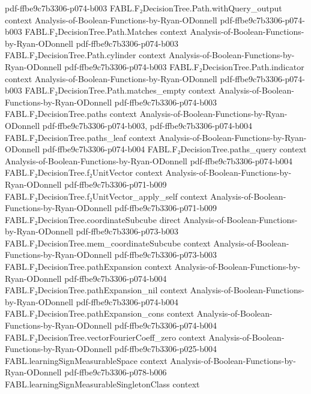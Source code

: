 \begin{theorem}
  {pdf-ffbe9c7b3306-p074-b003}
\proofstep
  {FABL.F₂DecisionTree.Path.withQuery_output}
  {context}
  {Analysis-of-Boolean-Functions-by-Ryan-ODonnell}
  {pdf-ffbe9c7b3306-p074-b003}
\proofstep
  {FABL.F₂DecisionTree.Path.Matches}
  {context}
  {Analysis-of-Boolean-Functions-by-Ryan-ODonnell}
  {pdf-ffbe9c7b3306-p074-b003}
\proofstep
  {FABL.F₂DecisionTree.Path.cylinder}
  {context}
  {Analysis-of-Boolean-Functions-by-Ryan-ODonnell}
  {pdf-ffbe9c7b3306-p074-b003}
\proofstep
  {FABL.F₂DecisionTree.Path.indicator}
  {context}
  {Analysis-of-Boolean-Functions-by-Ryan-ODonnell}
  {pdf-ffbe9c7b3306-p074-b003}
\proofstep
  {FABL.F₂DecisionTree.Path.matches_empty}
  {context}
  {Analysis-of-Boolean-Functions-by-Ryan-ODonnell}
  {pdf-ffbe9c7b3306-p074-b003}
\proofstep
  {FABL.F₂DecisionTree.paths}
  {context}
  {Analysis-of-Boolean-Functions-by-Ryan-ODonnell}
  {pdf-ffbe9c7b3306-p074-b003,
    pdf-ffbe9c7b3306-p074-b004}
\proofstep
  {FABL.F₂DecisionTree.paths_leaf}
  {context}
  {Analysis-of-Boolean-Functions-by-Ryan-ODonnell}
  {pdf-ffbe9c7b3306-p074-b004}
\proofstep
  {FABL.F₂DecisionTree.paths_query}
  {context}
  {Analysis-of-Boolean-Functions-by-Ryan-ODonnell}
  {pdf-ffbe9c7b3306-p074-b004}
\proofstep
  {FABL.F₂DecisionTree.f₂UnitVector}
  {context}
  {Analysis-of-Boolean-Functions-by-Ryan-ODonnell}
  {pdf-ffbe9c7b3306-p071-b009}
\proofstep
  {FABL.F₂DecisionTree.f₂UnitVector_apply_self}
  {context}
  {Analysis-of-Boolean-Functions-by-Ryan-ODonnell}
  {pdf-ffbe9c7b3306-p071-b009}
\proofstep
  {FABL.F₂DecisionTree.coordinateSubcube}
  {direct}
  {Analysis-of-Boolean-Functions-by-Ryan-ODonnell}
  {pdf-ffbe9c7b3306-p073-b003}
\proofstep
  {FABL.F₂DecisionTree.mem_coordinateSubcube}
  {context}
  {Analysis-of-Boolean-Functions-by-Ryan-ODonnell}
  {pdf-ffbe9c7b3306-p073-b003}
\proofstep
  {FABL.F₂DecisionTree.pathExpansion}
  {context}
  {Analysis-of-Boolean-Functions-by-Ryan-ODonnell}
  {pdf-ffbe9c7b3306-p074-b004}
\proofstep
  {FABL.F₂DecisionTree.pathExpansion_nil}
  {context}
  {Analysis-of-Boolean-Functions-by-Ryan-ODonnell}
  {pdf-ffbe9c7b3306-p074-b004}
\proofstep
  {FABL.F₂DecisionTree.pathExpansion_cons}
  {context}
  {Analysis-of-Boolean-Functions-by-Ryan-ODonnell}
  {pdf-ffbe9c7b3306-p074-b004}
\proofstep
  {FABL.F₂DecisionTree.vectorFourierCoeff_zero}
  {context}
  {Analysis-of-Boolean-Functions-by-Ryan-ODonnell}
  {pdf-ffbe9c7b3306-p025-b004}
\proofstep
  {FABL.learningSignMeasurableSpace}
  {context}
  {Analysis-of-Boolean-Functions-by-Ryan-ODonnell}
  {pdf-ffbe9c7b3306-p078-b006}
\proofstep
  {FABL.learningSignMeasurableSingletonClass}
  {context}

\end{theorem}
